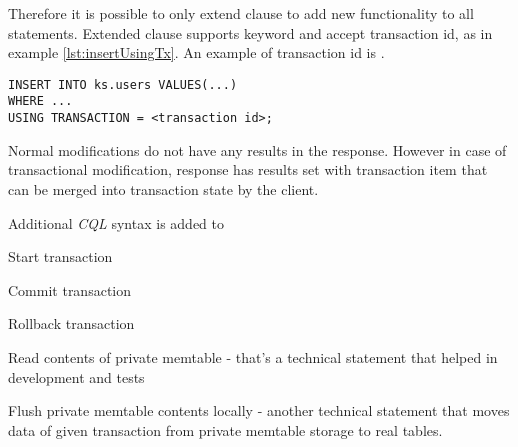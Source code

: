Therefore it is possible to only extend  clause to add new functionality to all statements. Extended  clause supports  keyword and accept transaction id, as in example \ref{lst:insertUsingTx}. An example of transaction id is .


\begin{lstlisting}[style=outcode,label={lst:insertUsingTx},caption={Insert statement with using transactional clause}]
INSERT INTO ks.users VALUES(...) 
WHERE ...
USING TRANSACTION = <transaction id>;
\end{lstlisting}


Normal modifications do not have any results in the response. However in case of transactional modification, response has results set with transaction item that can be merged into transaction state by the client.

Additional \emph{CQL} syntax is added to
\begin{enumerate*}
\item Start transaction
\item Commit transaction
\item Rollback transaction
\item Read contents of private memtable - that’s a technical statement that helped in development and tests
\item Flush private memtable contents locally - another technical statement that moves data of given transaction from private memtable storage to real tables.
\end{enumerate*}

